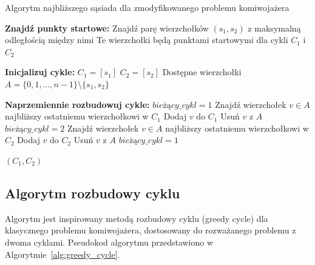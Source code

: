 \documentclass[12pt,a4paper]{article}
\begin{document}
\begin{algorithm}
\caption{Algorytm najbliższego sąsiada dla zmodyfikowanego problemu komiwojażera}
\label{alg:nearest_neighbor}
\begin{algorithmic}[1]
\State \textbf{Znajdź punkty startowe:}
\State Znajdź parę wierzchołków $(s_1, s_2)$ z maksymalną odległością między nimi
\State Te wierzchołki będą punktami startowymi dla cykli $C_1$ i $C_2$

\State \textbf{Inicjalizuj cykle:}
\State $C_1 = [s_1]$
\State $C_2 = [s_2]$
\State Dostępne wierzchołki $A = \{0, 1, ..., n-1\} \setminus \{s_1, s_2\}$

\State \textbf{Naprzemiennie rozbudowuj cykle:}
\State $bieżący\_cykl = 1$ 
        \State Znajdź wierzchołek $v \in A$ najbliższy ostatniemu wierzchołkowi w $C_1$
        \State Dodaj $v$ do $C_1$
        \State Usuń $v$ z $A$
        \State $bieżący\_cykl = 2$
    \Else
        \State Znajdź wierzchołek $v \in A$ najbliższy ostatniemu wierzchołkowi w $C_2$
        \State Dodaj $v$ do $C_2$
        \State Usuń $v$ z $A$
        \State $bieżący\_cykl = 1$
    \EndIf
\EndWhile

\State \Return $(C_1, C_2)$
\end{algorithmic}
\end{algorithm}

\subsection{Algorytm rozbudowy cyklu}
Algorytm jest inspirowany metodą rozbudowy cyklu (greedy cycle) dla klasycznego problemu komiwojażera, dostosowany do rozważanego problemu z dwoma cyklami. Pseudokod algorytmu przedstawiono w Algorytmie~\ref{alg:greedy_cycle}.
\end{document}

